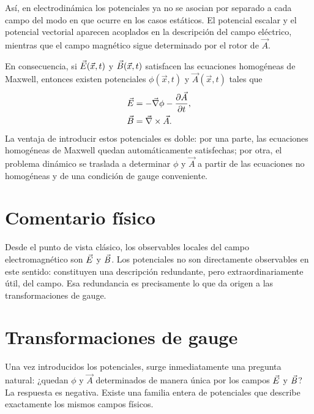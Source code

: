 \documentclass[../main.tex]{subfiles}
\begin{document}
Así, en electrodinámica los potenciales ya no se asocian por separado a cada campo del modo en que ocurre en los casos estáticos. El potencial escalar y el potencial vectorial aparecen acoplados en la descripción del campo eléctrico, mientras que el campo magnético sigue determinado por el rotor de $\vec A$.

En consecuencia, si $\vec{E}(\vec x,t)$ y $\vec{B}(\vec x,t)$ satisfacen las ecuaciones homogéneas de Maxwell, entonces existen potenciales $\phi(\vec x,t)$ y $\vec A(\vec x,t)$ tales que
\begin{align}
    \vec{E} &= -\vec\nabla \phi - \frac{\partial \vec A}{\partial t}, \label{3.campo-electrico-en-potenciales}\\
    \vec{B} &= \vec\nabla\times\vec A.\label{3.campo-magnetico-en-potenciales}
\end{align}
La ventaja de introducir estos potenciales es doble: por una parte, las ecuaciones homogéneas de Maxwell quedan automáticamente satisfechas; por otra, el problema dinámico se traslada a determinar $\phi$ y $\vec A$ a partir de las ecuaciones no homogéneas y de una condición de gauge conveniente.

\section*{Comentario físico}
Desde el punto de vista clásico, los observables locales del campo electromagnético son $\vec{E}$ y $\vec{B}$. Los potenciales no son directamente observables en este sentido: constituyen una descripción redundante, pero extraordinariamente útil, del campo. Esa redundancia es precisamente lo que da origen a las transformaciones de gauge.

\section*{Transformaciones de gauge}

Una vez introducidos los potenciales, surge inmediatamente una pregunta natural: ¿quedan $\phi$ y $\vec A$ determinados de manera única por los campos $\vec{E}$ y $\vec{B}$? La respuesta es negativa. Existe una familia entera de potenciales que describe exactamente los mismos campos físicos.
\end{document}

